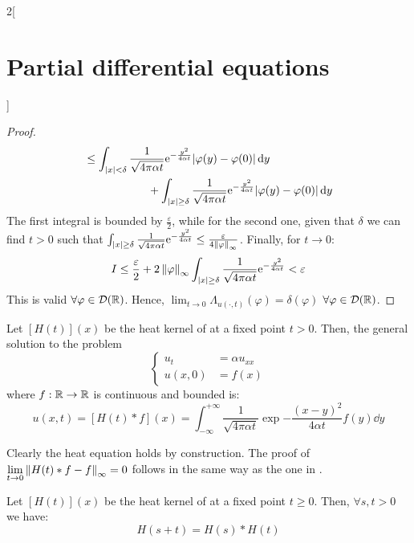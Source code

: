 \documentclass[../../../main_math.tex]{subfiles}
\begin{document}
\begin{multicols}{2}[\section{Partial differential equations}]
\begin{proof}
\begin{align*}
      \begin{split}
        &\leq \int_{\abs{x}<\delta}\frac{1}{\sqrt{4\pi\alpha t}}\mathrm{e}^{-\frac{y^2}{4\alpha t}}\abs{\varphi(y)-\varphi(0)}\dd{y}\\
        &\hspace{2cm}+\int_{\abs{x}\geq\delta}\frac{1}{\sqrt{4\pi\alpha t}}\mathrm{e}^{-\frac{y^2}{4\alpha t}}\abs{\varphi(y)-\varphi(0)}\dd{y}
      \end{split}
    \end{align*}
    The first integral is bounded by $\frac{\varepsilon}{2}$, while for the second one, given that $\delta$ we can find $t>0$ such that $\int_{\abs{x}\geq\delta}\frac{1}{\sqrt{4\pi\alpha t}}\mathrm{e}^{-\frac{y^2}{4\alpha t}}\leq \frac{\varepsilon}{4\left\|\varphi\right\|_\infty}$. Finally, for $t\to 0$:
    $$I\leq \frac{\varepsilon}{2} + 2\left\|\varphi\right\|_\infty\int_{\abs{x}\geq\delta}\frac{1}{\sqrt{4\pi\alpha t}}\mathrm{e}^{-\frac{y^2}{4\alpha t}}<\varepsilon$$
    This is valid $\forall\varphi\in\mathcal{D}(\mathbb{R})$. Hence, $\displaystyle \lim_{t\to 0} \Lambda_{u(\cdot,t)}(\varphi) = \delta(\varphi)$ $\forall\varphi\in\mathcal{D}(\mathbb{R})$.
  \end{proof}
  \begin{corollary}\label{PDE:heatgeneralcoro}
    Let $[H(t)](x)$ be the heat kernel of  at a fixed point $t>0$. Then, the general solution to the problem
    \begin{equation}\label{PDE:heatgeneral}
      \left\{
      \begin{aligned}
        u_{t}  & =\alpha u_{xx} \\
        u(x,0) & =f(x)
      \end{aligned}
      \right.
    \end{equation}
    where $f:\mathbb{R}\rightarrow\mathbb{R}$ is continuous and bounded is: $$u(x,t)=[H(t)*f](x)=\int_{-\infty}^{+\infty}\frac{1}{\sqrt{4\pi\alpha t}}\exp{-\frac{{(x - y)}^2}{4\alpha t}}f(y)\dd{y}$$
  \end{corollary}
  \begin{sproof}
    Clearly the heat equation holds by construction. The proof of $\displaystyle\lim_{t\to 0}\left\|H(t)*f - f\right\|_\infty=0$ follows in the same way as the one in .
  \end{sproof}
  \begin{proposition}
    Let $[H(t)](x)$ be the heat kernel of  at a fixed point $t\geq 0$. Then, $\forall s,t>0$ we have: $$H(s+t)=H(s)*H(t)$$
  \end{proposition}

\end{multicols}
\end{document}

